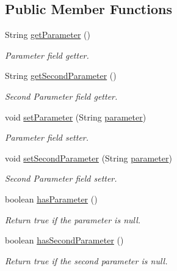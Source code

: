 \subsection*{Public Member Functions}
\begin{DoxyCompactItemize}
\item 
String \hyperlink{classpkg__commands_1_1Command_a41c92d445be73ea9d62320c65efb8434}{get\-Parameter} ()
\begin{DoxyCompactList}\small\item\em Parameter field getter. \end{DoxyCompactList}\item 
String \hyperlink{classpkg__commands_1_1Command_a20d3ebdc0683a87b43be2a92a1cad111}{get\-Second\-Parameter} ()
\begin{DoxyCompactList}\small\item\em Second Parameter field getter. \end{DoxyCompactList}\item 
void \hyperlink{classpkg__commands_1_1Command_a18446243a5fd360e9341b4b141c0cccc}{set\-Parameter} (String \hyperlink{classpkg__commands_1_1Command_a089fe1b30b43b2ad5f0dcb2f0ffc2fdd}{parameter})
\begin{DoxyCompactList}\small\item\em Parameter field setter. \end{DoxyCompactList}\item 
void \hyperlink{classpkg__commands_1_1Command_af6de3828c27cd491ad24c4a97d69e856}{set\-Second\-Parameter} (String \hyperlink{classpkg__commands_1_1Command_a089fe1b30b43b2ad5f0dcb2f0ffc2fdd}{parameter})
\begin{DoxyCompactList}\small\item\em Second Parameter field setter. \end{DoxyCompactList}\item 
boolean \hyperlink{classpkg__commands_1_1Command_a02af95ab3f1898a66259ab7c177b6998}{has\-Parameter} ()
\begin{DoxyCompactList}\small\item\em Return true if the parameter is null. \end{DoxyCompactList}\item 
boolean \hyperlink{classpkg__commands_1_1Command_add688a76d80576c34f23927da19b9e2d}{has\-Second\-Parameter} ()
\begin{DoxyCompactList}\small\item\em Return true if the second parameter is null. \end{DoxyCompactList}\item 

\end{DoxyCompactItemize}
